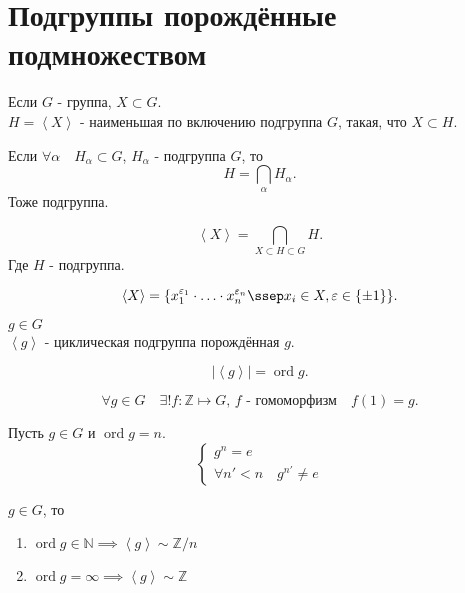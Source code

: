\documentclass[11pt, oneside]{article}   	%
\DeclareMathOperator{\odr}{ord}
\begin{document}
\section{Подгруппы порождённые подмножеством}
    \begin{definition}
        Если $G$ - группа, $X \subset G$.\\
        $H = \left<X\right>$ - наименьшая по включению подгруппа $G$, такая, что $X \subset H$. 
    \end{definition}
    \begin{dlemma}
        Если $\forall{\alpha}\quad H_{\alpha} \subset G$, $H_{\alpha}$ - подгруппа $G$, то 
        \[ H = \bigcap_{\alpha} H_{\alpha}  .\]
        Тоже подгруппа.
    \end{dlemma}
    \begin{dlemma}
        \[ \left<X\right> = \bigcap_{X \subset H \subset G} H .\]
        Где $H$ - подгруппа.
    \end{dlemma}
    \begin{dlemma}
        \[ \left<X\right> = \{x_1^{\varepsilon_1} \cdot \ldots \cdot x_n^{\varepsilon_n}\ssep x_i\in X, \varepsilon\in \{\pm 1\} \}  .\]
    \end{dlemma}
    \begin{definition}
        $g\in G$\\
        $\left<g\right>$ - циклическая подгруппа порождённая $g$.
    \end{definition}
    \begin{definition}
    \[ |\left<g\right>| = \odr g .\] 
    \end{definition}
    \begin{dlemma}
        \[ \forall{g\in G}\quad \exists!{f: \mathbb{Z} \mapsto G \text{, $f$ - гомоморфизм}}\quad f(1) = g .\] 
    \end{dlemma}
    \begin{dlemma}
        Пусть $g\in G$ и $\odr g = n$.\\
        \begin{equation*}
            \begin{cases}
                g^{n} = e\\
                \forall{n' < n}\quad g^{n'} \neq e
            \end{cases}
        \end{equation*}
    \end{dlemma}
    \begin{theorem}
        $g\in G$, то
        \begin{enumerate}
            \item $\odr g\in \mathbb{N} \implies \left<g\right> \sim \mathbb{Z}/n$
            \item $\odr g = \infty \implies \left<g\right> \sim \mathbb{Z}$
        \end{enumerate}
    \end{theorem}
\end{document}
